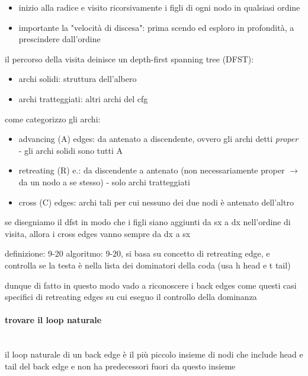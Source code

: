 \begin{itemize}
  \item inizio alla radice e visito ricorsivamente i figli di ogni nodo in qualsiasi ordine
  \item importante la "velocit\`a di discesa": prima scendo ed esploro in profondit\`a, a prescindere dall'ordine
\end{itemize}

il percorso della visita deinisce un depth-first spanning tree (DFST):
\begin{itemize}
  \item archi solidi: struttura dell'albero
  \item archi tratteggiati: altri archi del cfg
\end{itemize}

come categorizzo gli archi:
\begin{itemize}
  \item advancing (A) edges: da antenato a discendente, ovvero gli archi detti \textit{proper} - gli archi solidi sono tutti A
  \item retreating (R) e.: da discendente a antenato (non necessariamente proper $\rightarrow$ da un nodo a se stesso) - solo archi tratteggiati
  \item cross (C) edges: archi tali per cui nessuno dei due nodi \`e antenato dell'altro
\end{itemize}

\begin{emphasize}
    se disegniamo il dfst in modo che i figli siano aggiunti da sx a dx nell'ordine di visita, allora i cross edges vanno sempre da dx a sx
\end{emphasize}

definizione: 9-20
algoritmo: 9-20, si basa su concetto di retreating edge, e controlla se la testa \`e nella lista dei dominatori della coda (usa h head e t tail)

dunque di fatto in questo modo vado a riconoscere i back edges come questi casi specifici di retreating edges su cui eseguo il controllo della dominanza

\paragraph{trovare il loop naturale}~\\

il loop naturale di un back edge \`e il pi\`u piccolo insieme di nodi che include head e tail del back edge e non ha predecessori fuori da questo insieme 

